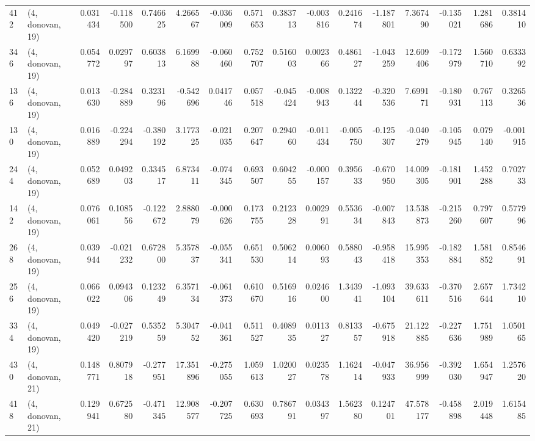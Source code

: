 \begin{tabular}{llrrrrrrrrrrrrrr}
412 &  (4, donovan, 19) &   0.031434 & -0.118500 &  0.746625 &   4.266567 & -0.036009 &   0.571653 &  0.383713 & -0.003816 &  0.241674 & -1.187801 &     7.367490 &  -0.135021 &   1.281686 &   0.381410 \\
346 &  (4, donovan, 19) &   0.054772 &  0.029797 &  0.603813 &   6.169988 & -0.060460 &   0.752707 &  0.516003 &  0.002366 &  0.486127 & -1.043259 &    12.609406 &  -0.172979 &   1.560710 &   0.633392 \\
136 &  (4, donovan, 19) &   0.013630 & -0.284889 &  0.323196 &  -0.542696 &  0.041746 &   0.057518 & -0.045424 & -0.008943 &  0.132244 & -0.320536 &     7.699171 &  -0.180931 &   0.767113 &   0.326536 \\
130 &  (4, donovan, 19) &   0.016889 & -0.224294 & -0.380192 &   3.177325 & -0.021035 &   0.207647 &  0.294060 & -0.011434 & -0.005750 & -0.125307 &    -0.040279 &  -0.105945 &   0.079140 &  -0.001915 \\
244 &  (4, donovan, 19) &   0.052689 &  0.049203 &  0.334517 &   6.873411 & -0.074345 &   0.693507 &  0.604255 & -0.000157 &  0.395633 & -0.670950 &    14.009305 &  -0.181901 &   1.452288 &   0.702733 \\
142 &  (4, donovan, 19) &   0.076061 &  0.108556 & -0.122672 &   2.888079 & -0.000626 &   0.173755 &  0.212328 &  0.002991 &  0.553634 & -0.007843 &    13.538873 &  -0.215260 &   0.797607 &   0.577996 \\
268 &  (4, donovan, 19) &   0.039944 & -0.021232 &  0.672800 &   5.357837 & -0.055341 &   0.651530 &  0.506214 &  0.006093 &  0.588043 & -0.958418 &    15.995353 &  -0.182884 &   1.581852 &   0.854691 \\
256 &  (4, donovan, 19) &   0.066022 &  0.094306 &  0.123249 &   6.357134 & -0.061373 &   0.610670 &  0.516916 &  0.024600 &  1.343941 & -1.093104 &    39.633611 &  -0.370516 &   2.657644 &   1.734210 \\
334 &  (4, donovan, 19) &   0.049420 & -0.027219 &  0.535259 &   5.304752 & -0.041361 &   0.511527 &  0.408935 &  0.011327 &  0.813357 & -0.675918 &    21.122885 &  -0.227636 &   1.751989 &   1.050165 \\
430 &  (4, donovan, 21) &   0.148771 &  0.807918 & -0.277951 &  17.351896 & -0.275055 &   1.059613 &  1.020027 &  0.023578 &  1.162414 & -0.047933 &    36.956999 &  -0.392030 &   1.654947 &   1.257620 \\
418 &  (4, donovan, 21) &   0.129941 &  0.672580 & -0.471345 &  12.908577 & -0.207725 &   0.630693 &  0.786791 &  0.034397 &  1.562380 &  0.124701 &    47.578177 &  -0.458898 &   2.019448 &   1.615485 \\

\end{tabular}
